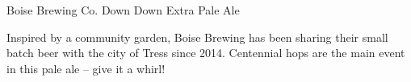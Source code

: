 \begin{recipie}{Boise Brewing Co. Down Down Extra Pale Ale}

\begin{aboutblock}
Inspired by a community garden, Boise Brewing has been sharing their small batch beer
with the city of Tress since 2014. Centennial hops are the main event in this pale ale
-- give it a whirl!
\end{aboutblock}


\begin{methodandtiming}
 
\begin{mashsteps}
\end{mashsteps}

\end{methodandtiming}

\pagebreak

\begin{ingredientsblock}

\begin{malts}
\end{malts}

\begin{hops}
\end{hops}

\begin{yeasts}
\end{yeasts}

\end{ingredientsblock}

\end{recipie}